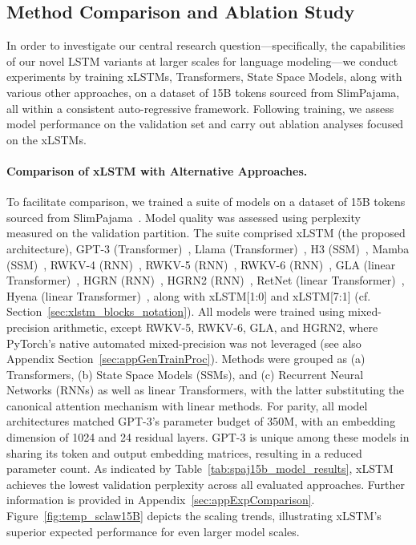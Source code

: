 \subsection{Method Comparison and Ablation Study}
\label{sec:ExpComparison}

In order to investigate our central research question—specifically, the capabilities of our novel LSTM variants at larger scales for language modeling—we conduct experiments by training xLSTMs, Transformers, State Space Models, along with various other approaches, on a dataset of 15B tokens sourced from SlimPajama, all within a consistent auto-regressive framework. Following training, we assess model performance on the validation set and carry out ablation analyses focused on the xLSTMs.

\paragraph{Comparison of xLSTM with Alternative Approaches.} To facilitate comparison, we trained a suite of models on a dataset of 15B tokens sourced from SlimPajama~\citep{Soboleva:23}. Model quality was assessed using perplexity measured on the validation partition. The suite comprised xLSTM (the proposed architecture), GPT-3 (Transformer)~\citep{Brown:20short}, Llama (Transformer)~\citep{Touvron:23arxiv}, H3 (SSM)~\citep{Fu:23}, Mamba (SSM)~\citep{Gu:24arxiv}, RWKV-4 (RNN)~\citep{Peng:23arxivshort}, RWKV-5 (RNN)~\citep{Peng:24arxivshort}, RWKV-6 (RNN)~\citep{Peng:24arxivshort}, GLA (linear Transformer)~\citep{Yang:23arxiv}, HGRN (RNN)~\citep{Qin:23}, HGRN2 (RNN)~\citep{Qin:24arxiv}, RetNet (linear Transformer)~\citep{Sun:23arxiv}, Hyena (linear Transformer)~\citep{Poli:23}, along with xLSTM[1:0] and xLSTM[7:1] (cf. Section~\ref{sec:xlstm_blocks_notation}). All models were trained using mixed-precision arithmetic, except RWKV-5, RWKV-6, GLA, and HGRN2, where PyTorch's native automated mixed-precision was not leveraged (see also Appendix Section~\ref{sec:appGenTrainProc}). Methods were grouped as (a) Transformers, (b) State Space Models (SSMs), and (c) Recurrent Neural Networks (RNNs) as well as linear Transformers, with the latter substituting the canonical attention mechanism with linear methods. For parity, all model architectures matched GPT-3’s parameter budget of 350M, with an embedding dimension of 1024 and 24 residual layers. GPT-3 is unique among these models in sharing its token and output embedding matrices, resulting in a reduced parameter count. As indicated by Table~\ref{tab:spaj15b_model_results}, xLSTM achieves the lowest validation perplexity across all evaluated approaches. Further information is provided in Appendix~\ref{sec:appExpComparison}. Figure~\ref{fig:temp_sclaw15B} depicts the scaling trends, illustrating xLSTM’s superior expected performance for even larger model scales.

